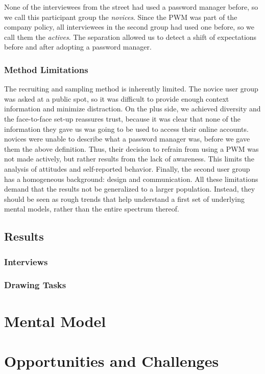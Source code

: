None of the interviewees from the street had used a password manager before, so we call this participant group the \textit{novices}. Since the \gls{PWM} was part of the company policy, all interviewees in the second group had used one before, so we call them the \textit{actives}. The separation allowed us to detect a shift of expectations before and after adopting a password manager. 

\subsubsection{Method Limitations}
The recruiting and sampling method is inherently limited. The novice user group was asked at a public spot, so it was difficult to provide enough context information and minimize distraction. On the plus side, we achieved diversity and the face-to-face set-up reassures trust, because it was clear that none of the information they gave us was going to be used to access their online accounts.  novices were unable to describe what a password manager was, before we gave them the above definition. Thus, their decision to refrain from using a \gls{PWM} was not made actively, but rather results from the lack of awareness. This limits the analysis of attitudes and self-reported behavior. Finally, the second user group has a homogeneous background: design and communication. All these limitations demand that the results not be generalized to a larger population. Instead, they should be seen as rough trends that help understand a first set of underlying mental models, rather than the entire spectrum thereof.

\subsection{Results}

\subsubsection{Interviews}
\subsubsection{Drawing Tasks}


\section{Mental Model}


\section{Opportunities and Challenges}

